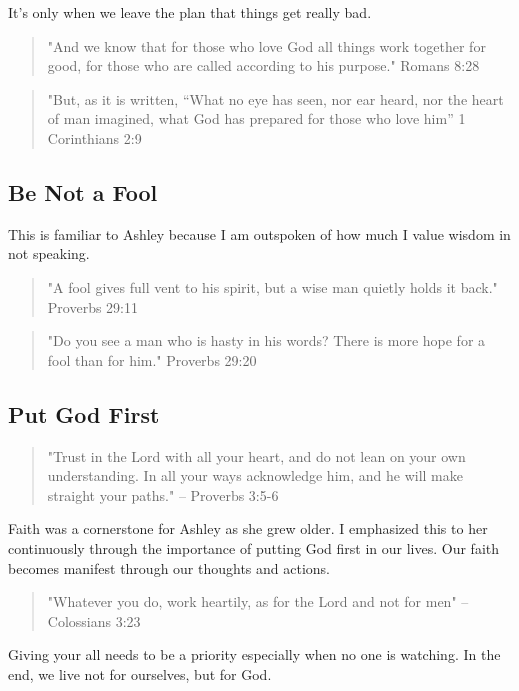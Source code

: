 \documentclass[11pt,a4paper,sans]{article}
\begin{document}
It's only when we leave the plan that things get really bad.

\begin{quote}
    "And we know that for those who love God all things work together for good, for those who 
    are called according to his purpose." Romans 8:28
\end{quote}

\begin{quote}
    "But, as it is written, “What no eye has seen, nor ear heard, nor the heart of man imagined, what God has prepared for those who love him” 1 Corinthians 2:9
\end{quote}


\subsection{Be Not a Fool}

This is familiar to Ashley because I am outspoken of how much I value wisdom
in not speaking. 
\begin{quote}
    "A fool gives full vent to his spirit,
but a wise man quietly holds it back." Proverbs 29:11
\end{quote}

\begin{quote}
    "Do you see a man who is hasty in his words?
There is more hope for a fool than for him." Proverbs 29:20
\end{quote}

\subsection{Put God First}
\begin{quote}
    "Trust in the Lord with all your heart, and do not lean on 
your own understanding. In all your ways acknowledge him, and 
he will make straight your paths." -- Proverbs 3:5-6
\end{quote}

Faith was a cornerstone for Ashley as she grew older. I emphasized this
to her continuously through the importance of putting God first in our lives.
Our faith becomes manifest through our thoughts and actions.

\begin{quote}
    "Whatever you do, work heartily, as for the Lord and not for men" -- Colossians 3:23
\end{quote}

Giving your all needs to be a priority especially when no one is watching. In the 
end, we live not for ourselves, but for God.
\end{document}
